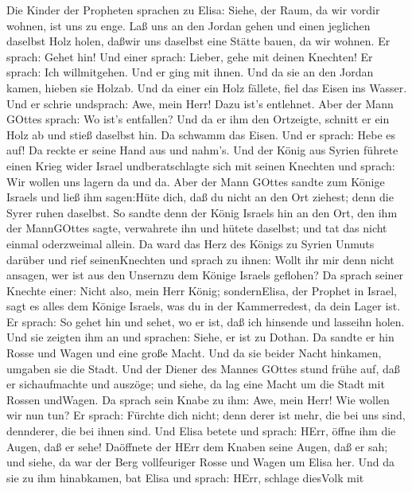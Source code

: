  Die Kinder der Propheten sprachen zu Elisa: Siehe, der
Raum, da wir vordir wohnen, ist uns zu enge.  Laß uns an den
Jordan gehen und einen jeglichen daselbst Holz holen, daßwir uns
daselbst eine Stätte bauen, da wir wohnen. Er sprach: Gehet hin!
 Und einer sprach: Lieber, gehe mit deinen Knechten! Er
sprach: Ich willmitgehen.  Und er ging mit ihnen. Und da sie
an den Jordan kamen, hieben sie Holzab.  Und da einer ein
Holz fällete, fiel das Eisen ins Wasser. Und er schrie undsprach: Awe,
mein Herr! Dazu ist's entlehnet.  Aber der Mann GOttes
sprach: Wo ist's entfallen? Und da er ihm den Ortzeigte, schnitt er ein
Holz ab und stieß daselbst hin. Da schwamm das Eisen.  Und
er sprach: Hebe es auf! Da reckte er seine Hand aus und nahm's.
 Und der König aus Syrien führete einen Krieg wider Israel
undberatschlagte sich mit seinen Knechten und sprach: Wir wollen uns
lagern da und da.  Aber der Mann GOttes sandte zum Könige
Israels und ließ ihm sagen:Hüte dich, daß du nicht an den Ort ziehest;
denn die Syrer ruhen daselbst.  So sandte denn der König
Israels hin an den Ort, den ihm der MannGOttes sagte, verwahrete ihn und
hütete daselbst; und tat das nicht einmal oderzweimal allein.
 Da ward das Herz des Königs zu Syrien Unmuts darüber und
rief seinenKnechten und sprach zu ihnen: Wollt ihr mir denn nicht
ansagen, wer ist aus den Unsernzu dem Könige Israels geflohen?
 Da sprach seiner Knechte einer: Nicht also, mein Herr
König; sondernElisa, der Prophet in Israel, sagt es alles dem Könige
Israels, was du in der Kammerredest, da dein Lager ist.  Er
sprach: So gehet hin und sehet, wo er ist, daß ich hinsende und lasseihn
holen. Und sie zeigten ihm an und sprachen: Siehe, er ist zu Dothan.
 Da sandte er hin Rosse und Wagen und eine große Macht. Und
da sie beider Nacht hinkamen, umgaben sie die Stadt.  Und
der Diener des Mannes GOttes stund frühe auf, daß er sichaufmachte und
auszöge; und siehe, da lag eine Macht um die Stadt mit Rossen undWagen.
Da sprach sein Knabe zu ihm: Awe, mein Herr! Wie wollen wir nun tun?
 Er sprach: Fürchte dich nicht; denn derer ist mehr, die
bei uns sind, dennderer, die bei ihnen sind.  Und Elisa
betete und sprach: HErr, öffne ihm die Augen, daß er sehe! Daöffnete der
HErr dem Knaben seine Augen, daß er sah; und siehe, da war der Berg
vollfeuriger Rosse und Wagen um Elisa her.  Und da sie zu
ihm hinabkamen, bat Elisa und sprach: HErr, schlage diesVolk mit
